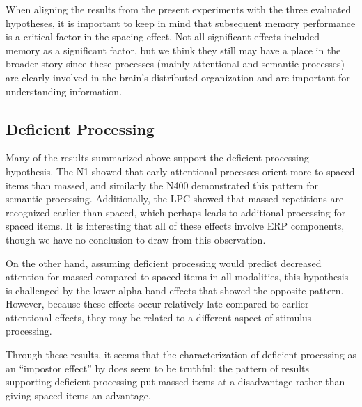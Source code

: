 
When aligning the results from the present experiments with the three evaluated hypotheses, it is important to keep in mind that subsequent memory performance is a critical factor in the spacing effect.  Not all significant effects included memory as a significant factor, but we think they still may have a place in the broader story since these processes (mainly attentional and semantic processes) are clearly involved in the brain's distributed organization and are important for understanding information.

\subsection{Deficient Processing}

Many of the results summarized above support the deficient processing hypothesis.  The N1 showed that early attentional processes orient more to spaced items than massed, and similarly the N400 demonstrated this pattern for semantic processing.  Additionally, the LPC showed that massed repetitions are recognized earlier than spaced, which perhaps leads to additional processing for spaced items.  It is interesting that all of these effects involve ERP components, though we have no conclusion to draw from this observation.

On the other hand, assuming deficient processing would predict decreased attention for massed compared to spaced items in all modalities, this hypothesis is challenged by the lower alpha band effects that showed the opposite pattern.  However, because these effects occur relatively late compared to earlier attentional effects, they may be related to a different aspect of stimulus processing.

Through these results, it seems that the characterization of deficient processing as an ``impostor effect'' by  does seem to be truthful: the pattern of results supporting deficient processing put massed items at a disadvantage rather than giving spaced items an advantage.

